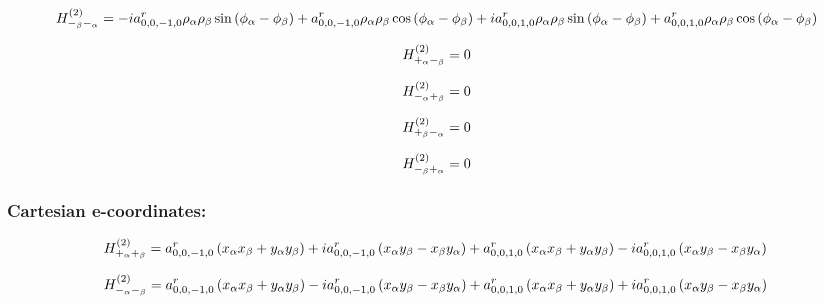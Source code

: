 \documentclass[fleqn]{article}
\begin{document}
\begin{dmath*}
H_{-_{\beta}-_{\alpha}}^{(2)}=-  i a^{r}_{0,0,-1,0} \rho_{\alpha} \rho_{\beta} \sin{\left (\phi_{\alpha} - \phi_{\beta} \right )} + a^{r}_{0,0,-1,0} \rho_{\alpha} \rho_{\beta} \cos{\left (\phi_{\alpha} - \phi_{\beta} \right )} +  i a^{r}_{0,0,1,0} \rho_{\alpha} \rho_{\beta} \sin{\left (\phi_{\alpha} - \phi_{\beta} \right )} + a^{r}_{0,0,1,0} \rho_{\alpha} \rho_{\beta} \cos{\left (\phi_{\alpha} - \phi_{\beta} \right )}\\
\end{dmath*}

\begin{dmath*}
H_{+_{\alpha}-_{\beta}}^{(2)}=0\\
\end{dmath*}

\begin{dmath*}
H_{-_{\alpha}+_{\beta}}^{(2)}=0\\
\end{dmath*}

\begin{dmath*}
H_{+_{\beta}-_{\alpha}}^{(2)}=0\\
\end{dmath*}

\begin{dmath*}
H_{-_{\beta}+_{\alpha}}^{(2)}=0\\
\end{dmath*}
\subsubsection*{Cartesian e-coordinates:}

\begin{dmath*}
H_{+_{\alpha}+_{\beta}}^{(2)}=a^{r}_{0,0,-1,0} \left(x_{\alpha} x_{\beta} + y_{\alpha} y_{\beta}\right) +  i a^{r}_{0,0,-1,0} \left(x_{\alpha} y_{\beta} - x_{\beta} y_{\alpha}\right) + a^{r}_{0,0,1,0} \left(x_{\alpha} x_{\beta} + y_{\alpha} y_{\beta}\right) -  i a^{r}_{0,0,1,0} \left(x_{\alpha} y_{\beta} - x_{\beta} y_{\alpha}\right)\\
\end{dmath*}

\begin{dmath*}
H_{-_{\alpha}-_{\beta}}^{(2)}=a^{r}_{0,0,-1,0} \left(x_{\alpha} x_{\beta} + y_{\alpha} y_{\beta}\right) -  i a^{r}_{0,0,-1,0} \left(x_{\alpha} y_{\beta} - x_{\beta} y_{\alpha}\right) + a^{r}_{0,0,1,0} \left(x_{\alpha} x_{\beta} + y_{\alpha} y_{\beta}\right) +  i a^{r}_{0,0,1,0} \left(x_{\alpha} y_{\beta} - x_{\beta} y_{\alpha}\right)\\
\end{dmath*}
\end{document}
